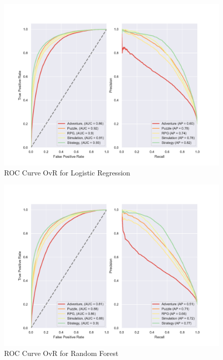 \documentclass[11pt, a4paper]{article}
\begin{document}
\begin{figure}
    \centering
    \includegraphics[width=\textwidth]{data/results/plots/logistic_regression_roc}
    \caption{ROC Curve OvR for Logistic Regression}
    \label{fig:lr_roc_fig}
\end{figure}


\begin{figure}
    \centering
    \includegraphics[width=\textwidth]{data/results/plots/random_forest_roc}
    \caption{ROC Curve OvR for Random Forest}
    \label{fig:rf_roc_fig}
\end{figure}
\end{document}
